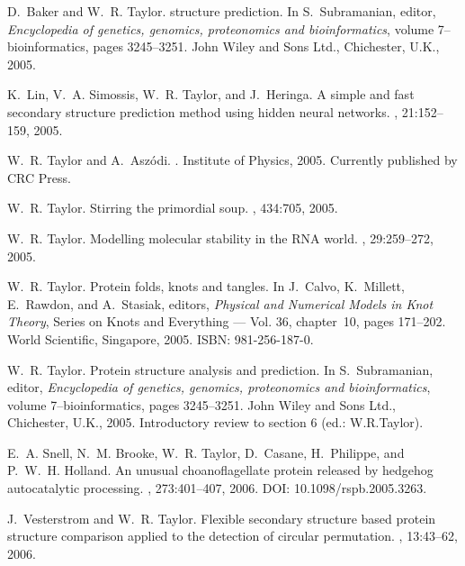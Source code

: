 \begin{thebibliography}{100}
D.~Baker and W.~R. Taylor.
 structure prediction.
\newblock In S.~Subramanian, editor, {\em Encyclopedia of genetics, genomics,
  proteonomics and bioinformatics}, volume 7--bioinformatics, pages 3245--3251.
  John Wiley and Sons Ltd., Chichester, U.K., 2005.

K.~Lin, V.~A. Simossis, W.~R. Taylor, and J.~Heringa.
\newblock A simple and fast secondary structure prediction method using hidden
  neural networks.
, 21:152--159, 2005.

W.~R. Taylor and A.~Asz\'odi.
.
\newblock Institute of Physics, 2005.
\newblock Currently published by CRC Press.

W.~R. Taylor.
\newblock Stirring the primordial soup.
, 434:705, 2005.

W.~R. Taylor.
\newblock Modelling molecular stability in the {RNA} world.
, 29:259--272, 2005.

W.~R. Taylor.
\newblock Protein folds, knots and tangles.
\newblock In J.~Calvo, K.~Millett, E.~Rawdon, and A.~Stasiak, editors, {\em
  Physical and Numerical Models in Knot Theory}, Series on Knots and Everything
  --- Vol. 36, chapter~10, pages 171--202. World Scientific, Singapore, 2005.
\newblock ISBN: 981-256-187-0.

W.~R. Taylor.
\newblock Protein structure analysis and prediction.
\newblock In S.~Subramanian, editor, {\em Encyclopedia of genetics, genomics,
  proteonomics and bioinformatics}, volume 7--bioinformatics, pages 3245--3251.
  John Wiley and Sons Ltd., Chichester, U.K., 2005.
\newblock Introductory review to section 6 (ed.: W.R.Taylor).

E.~A. Snell, N.~M. Brooke, W.~R. Taylor, D.~Casane, H.~Philippe, and P.~W.~H.
  Holland.
\newblock An unusual choanoflagellate protein released by hedgehog
  autocatalytic processing.
, 273:401--407, 2006.
\newblock DOI: 10.1098/rspb.2005.3263.

J.~Vesterstr{\/o}m and W.~R. Taylor.
\newblock Flexible secondary structure based protein structure comparison
  applied to the detection of circular permutation.
, 13:43--62, 2006.


\end{thebibliography}
